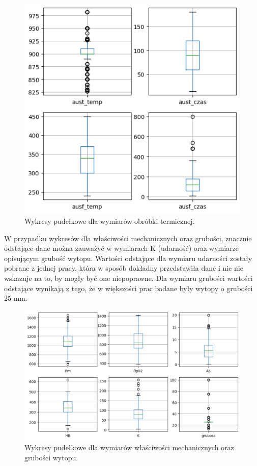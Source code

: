 \begin{figure}[ht]{}
	\centering
	\includegraphics[scale=0.5]{images/heat_box.png}
	\caption {
		 Wykresy pudełkowe dla wymiarów obróbki termicznej.
	}
	\label{fig:heat_box}
\end{figure}

W przypadku wykresów dla właściwości mechanicznych oraz grubości, znacznie odstające dane można zauważyć w wymiarach K (udarność) oraz wymiarze opisującym grubość wytopu. Wartości odstające dla wymiaru udarności zostały pobrane z jednej pracy, która w sposób dokładny przedstawiła dane i nic nie wskazuje na to, by mogły być one niepoprawne. Dla wymiaru grubości wartości odstające wynikają z tego, że w większości prac badane były wytopy o grubości 25 mm.
\begin{figure}[ht]{}
	\centering
	\includegraphics[scale=0.5]{images/prop_thickness_box.png}
	\caption {
		 Wykresy pudełkowe dla wymiarów właściwości mechanicznych oraz grubości wytopu.
	}
	\label{fig:prop_thickness_box}
\end{figure}

